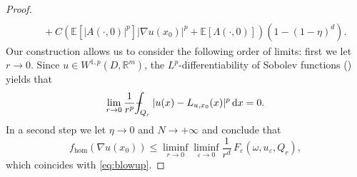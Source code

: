 \documentclass[JEP,XML,SOM,Unicode,published]{cedram}
\theoremstyle{definition}
\def\Xint#1{\mathchoice
{\XXint\displaystyle\textstyle{#1}}%
{\XXint\textstyle\scriptstyle{#1}}%
{\XXint\scriptstyle\scriptscriptstyle{#1}}%
{\XXint\scriptscriptstyle\scriptscriptstyle{#1}}%
\!\int}
\def\XXint#1#2#3{{\setbox0=\hbox{$#1{#2#3}{\int}$ }
\vcenter{\hbox{$#2#3$ }}\kern-.57\wd0}}
\def\dashint{\Xint-}
\let\e\varepsilon
\let\w\omega
\newcommand{\dx}{\,\mathrm{d}x}
\newcommand{\R}{\mathbb{R}}
\begin{document}
\begin{proof}
\begin{align*}
\\
&\quad+C\left(\mathbb{E}[|A(\cdot,0)|^p]|\nabla u(x_0)|^p+\mathbb{E}[\Lambda(\cdot,0)]\right)(1-(1-\eta)^d).
\end{align*}
Our construction allows us to consider the following order of limits: first we let $r\to 0$. Since $u\in W^{1,p}(D,\R^m)$, the $L^p$-differentiability of Sobolev functions (\cf \cite[Th.\,2, p.\,230]{EvGa}) yields that
\begin{equation*}
\lim_{r\to 0}\frac{1}{r^p}\dashint_{Q_r}|u(x)-L_{u,x_0}(x)|^p\dx=0.
\end{equation*}
In a second step we let $\eta\to 0$ and $N\to +\infty$ and conclude that
\begin{equation*}
f_{\hom}(\nabla u(x_0))\leq \liminf_{r\to 0}\liminf_{\e\to 0}\frac{1}{r^d}\,F_{\e}(\w,u_{\e},Q_r),
\end{equation*}
which coincides with \eqref{eq:blowup}.


\end{proof}
\end{document}
